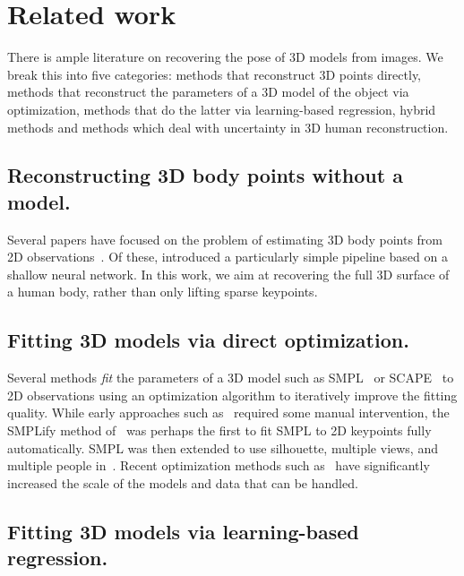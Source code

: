 \section{Related work}\label{s:related}

There is ample literature on recovering the pose of 3D models from images.
We break this into five categories: methods that reconstruct 3D points directly, methods that reconstruct the parameters of a 3D model of the object via optimization, methods that do the latter via learning-based regression, hybrid methods and methods which deal with uncertainty in 3D human reconstruction.

\subsection{Reconstructing 3D body points without a model.}

Several papers have focused on the problem of estimating 3D body points from 2D observations~\cite{anguelov05scape,mehta17vnect,rogez18lcr-net,sun18integral,kolotouros19convolutional}.
Of these, {}\citet{martinez17a-simple} introduced a particularly simple pipeline based on a shallow neural network.
In this work, we aim at recovering the full 3D surface of a human body, rather than only lifting sparse keypoints.

\subsection{Fitting 3D models via direct optimization.}

Several methods \emph{fit} the parameters of a 3D model such as SMPL~\cite{loper15smpl} or SCAPE~\cite{anguelov05scape} to 2D observations using an optimization algorithm to iteratively improve the fitting quality.
While early approaches such as~\cite{guan09estimating,sigal08combined} required some manual intervention, the SMPLify method of~\citet{bogo16keep} was perhaps the first to fit SMPL to 2D keypoints fully automatically.
SMPL was then extended to use silhouette, multiple views, and multiple people in~\cite{lassner17unite,huang17towards,zanfir18monocular}.
Recent optimization methods such as~\cite{joo18total,pavlakos19expressive,xiang19monocular} have significantly increased the scale of the models and data that can be handled.

\subsection{Fitting 3D models via learning-based regression.}


